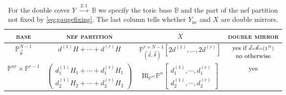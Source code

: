 \documentclass[12pt,a4paper,oneside]{amsart}
\numberwithin{equation}{section}
\theoremstyle{definition}
\theoremstyle{remark}
\newcommand{\cP}{\mathbb{P}}
\newcommand{\cB}{\mathbb{B}}
\newcommand{\Ync}{Y_{\mathrm{nc}}}
\begin{document}
\begin{table}[th]
\centering
\begin{tabular}{|c |c |c | c|}
	\hline
	\textsc{base} & \textsc{nef partition} & $X$ & \textsc{double mirror} \\
	\hline
	$\cP_{\vec{\theta}}^{N-1}$ & $d^{(1)}H+\cdots+ d^{(r)}H$ & $\cP^{r+N-1}_{(\vec{d}, \vec{\theta})} [2d^{(1)}, \dots, 2d^{(r)}]$ & $\begin{matrix}\text{\small yes if }{\scriptstyle \vec{d}=\vec{\theta}=(1^N) } \\ \text{\small no otherwise}\end{matrix}$\\
	$\cP^{\kappa r}\times \cP^{r-1}$ & $\left( \begin{matrix}d^{(1)}_1 H_1+\cdots+ d^{(r)}_1 H_1 \\ d^{(1)}_2 H_2+\cdots+ d^{(r)}_2 H_2\end{matrix} \right)$ & Bl$_{\cP^{\kappa r}} \cP^{n} \left[ \begin{matrix}d^{(1)}_1, \cdots ,d^{(r)}_1 \\ d^{(1)}_2,\cdots ,d^{(r)}_2\end{matrix} \right]$ &  {\small yes} \\
	\hline
\end{tabular}
\caption{For the double cover $Y \ \xrightarrow{ \ 2:1 \ } \ \cB$ we specify the toric base $\cB$ and the part of the nef partition not fixed by \eqref{eq:gaugefixing}. The last column tells whether $\Ync$ and $X$ are double mirrors.}
\label{tab:list}
\end{table}\par
\end{document}
